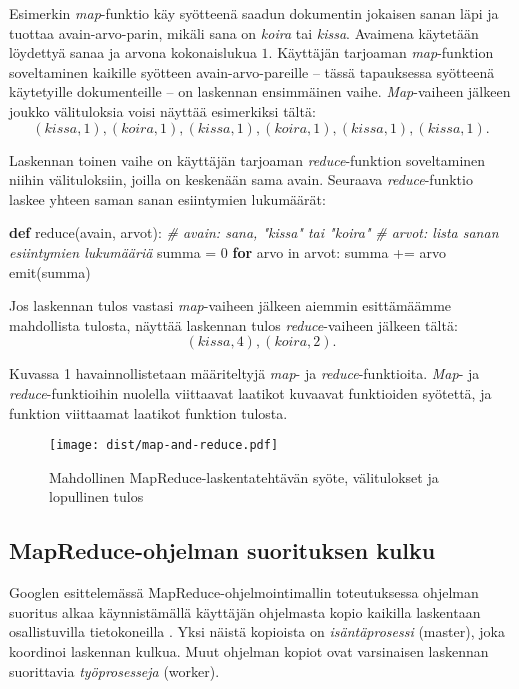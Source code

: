 \documentclass[finnish]{templates/tktltiki2}
\newenvironment{Shaded}{}{}
\newcommand{\KeywordTok}[1]{\textcolor[rgb]{0.00,0.44,0.13}{\textbf{{#1}}}}
\newcommand{\DataTypeTok}[1]{\textcolor[rgb]{0.56,0.13,0.00}{{#1}}}
\newcommand{\DecValTok}[1]{\textcolor[rgb]{0.25,0.63,0.44}{{#1}}}
\newcommand{\CommentTok}[1]{\textcolor[rgb]{0.38,0.63,0.69}{\textit{{#1}}}}
\newcommand{\NormalTok}[1]{{#1}}
\theoremstyle{definition}
\theoremstyle{remark}
\begin{document}
Esimerkin \emph{map}-funktio käy syötteenä saadun dokumentin jokaisen
sanan läpi ja tuottaa avain-arvo-parin, mikäli sana on \emph{koira} tai
\emph{kissa}. Avaimena käytetään löydettyä sanaa ja arvona kokonaislukua
\(1\). Käyttäjän tarjoaman \emph{map}-funktion soveltaminen kaikille
syötteen avain-arvo-pareille -- tässä tapauksessa syötteenä käytetyille
dokumenteille -- on laskennan ensimmäinen vaihe. \emph{Map}-vaiheen
jälkeen joukko välituloksia voisi näyttää esimerkiksi tältä: \[
(kissa, 1), (koira, 1), (kissa, 1), (koira, 1), (kissa, 1), (kissa, 1).
\]

Laskennan toinen vaihe on käyttäjän tarjoaman \emph{reduce}-funktion
soveltaminen niihin välituloksiin, joilla on keskenään sama avain.
Seuraava \emph{reduce}-funktio laskee yhteen saman sanan esiintymien
lukumäärät:

\begin{Shaded}
\begin{Highlighting}[]
\KeywordTok{def} \DataTypeTok{reduce}\NormalTok{(avain, arvot):}
    \CommentTok{# avain: sana, "kissa" tai "koira"}
    \CommentTok{# arvot: lista sanan esiintymien lukumääriä}
    \NormalTok{summa = }\DecValTok{0}
    \KeywordTok{for} \NormalTok{arvo in arvot:}
        \NormalTok{summa += arvo}
    \NormalTok{emit(summa)}
\end{Highlighting}
\end{Shaded}

Jos laskennan tulos vastasi \emph{map}-vaiheen jälkeen aiemmin
esittämäämme mahdollista tulosta, näyttää laskennan tulos
\emph{reduce}-vaiheen jälkeen tältä: \[
(kissa, 4), (koira, 2).
\]

Kuvassa 1 havainnollistetaan määriteltyjä \emph{map}- ja
\emph{reduce}-funktioita. \emph{Map}- ja \emph{reduce}-funktioihin
nuolella viittaavat laatikot kuvaavat funktioiden syötettä, ja
funktion viittaamat laatikot funktion tulosta.

\begin{figure}[!b]
\centering
\texttt{[image: dist/map-and-reduce.pdf]}
\caption{Mahdollinen MapReduce-laskentatehtävän syöte, välitulokset ja
lopullinen tulos}
\end{figure}

\subsection{MapReduce-ohjelman suorituksen
kulku}\label{mapreduce-ohjelman-suorituksen-kulku}

Googlen esittelemässä MapReduce-ohjelmointimallin toteutuksessa ohjelman
suoritus alkaa käynnistämällä käyttäjän ohjelmasta kopio kaikilla
laskentaan osallistuvilla tietokoneilla \cite{mapreduce}. Yksi
näistä kopioista on \emph{isäntäprosessi} (master), joka koordinoi
laskennan kulkua. Muut ohjelman kopiot ovat varsinaisen laskennan
suorittavia \emph{työprosesseja} (worker).
\end{document}
